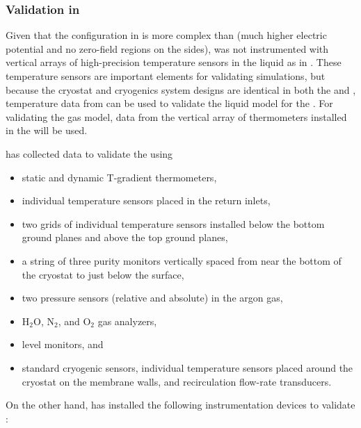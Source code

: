 \subsubsection{Validation in }
\label{sec:pddp-cfd-valid}


Given that the  configuration in  is more complex than  (much higher electric potential and no zero-field regions on the  sides),  was not instrumented with vertical arrays of high-precision temperature sensors in the liquid as in . These temperature sensors are important elements for validating  simulations, but because the cryostat and cryogenics system designs are identical in both the  and  , temperature data from  can be used to validate the liquid model for the . 
For validating the gas model, data from the vertical array of thermometers installed in the  will be used. 

 has collected data to validate the  using %
\begin{itemize}
\item static and dynamic T-gradient thermometers, 
\item individual temperature sensors placed in the return \lar inlets, 
\item two \twod grids of individual temperature sensors installed below the bottom ground planes and above the top ground planes, 
\item a string of three purity monitors vertically spaced from near the bottom of the cryostat to just below the \lar surface,
\item two pressure sensors (relative and absolute) in the argon gas,
\item H$_{2}$O, N$_{2}$, and O$_{2}$ gas analyzers, 
\item {} level monitors, and
\item standard cryogenic sensors, %
individual temperature sensors placed around
the cryostat on the membrane walls, and recirculation flow-rate transducers.
\end{itemize}

On the other hand,  has installed the following instrumentation devices to validate :


